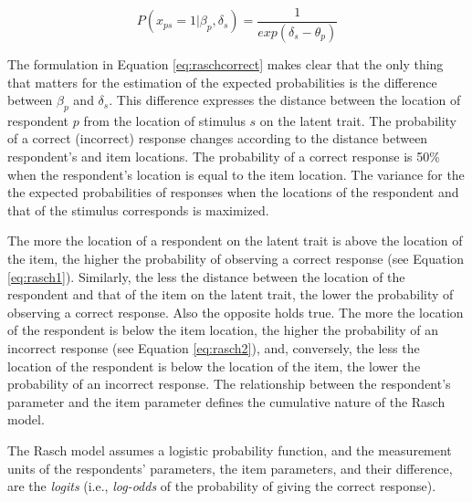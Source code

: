 \documentclass[12pt]{book}
\begin{document}
\begin{equation}\label{eq:inverseraschInverse}
	P(x_{ps} = 1 |\beta_p, \delta_s) = \frac{1}{exp(\delta_s - \theta_p)}
\end{equation}

The formulation in Equation \ref{eq:raschcorrect} makes clear that the only thing that matters for the estimation of the expected probabilities is the difference between $\beta_p$ and $\delta_s$. 
This difference expresses the distance between the location of respondent $p$ from the location of stimulus $s$ on the latent trait. 
The   probability  of a correct (incorrect) response changes according to the distance between respondent's and item locations. The probability of a correct response is 50\% when the respondent's location is equal to the item location. 
The variance for the the expected probabilities of responses when the locations of the respondent and that of the stimulus corresponds is maximized.

The more the location of a respondent on the latent trait is above the location of the item, the higher the probability of observing a correct response (see Equation \ref{eq:rasch1}). 
Similarly, the less the distance between the location of the respondent and that of the item on the latent trait, the lower the probability of observing a correct response.
Also the opposite holds true. 
The more the location of the respondent is below the item location, the higher  the probability of an incorrect response (see Equation \ref{eq:rasch2}), and, conversely, the less the location of the respondent is below the location of the item, the lower the probability of an incorrect response.
The relationship between the respondent's parameter and the item parameter defines the cumulative nature of the Rasch model. 

The Rasch model assumes a logistic probability function, and the measurement units of the respondents' parameters, the item parameters, and their difference, are the \emph{logits} (i.e., \emph{log-odds} of the probability of giving the correct response).

\end{document}
